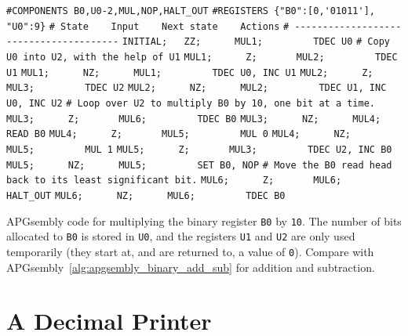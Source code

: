 \begin{apgsembly}
	\begin{algorithmic}\small
		\State \verb|#COMPONENTS B0,U0-2,MUL,NOP,HALT_OUT|
		\State \verb|#REGISTERS {"B0":[0,'01011'], "U0":9}|
		\State \verb|# State    Input    Next state    Actions|
		\State \verb|# ---------------------------------------|
		\State \verb|INITIAL;   ZZ;      MUL1;         TDEC U0|
		\State \verb||
		\State \verb|# Copy U0 into U2, with the help of U1|
		\State \verb|MUL1;      Z;       MUL2;         TDEC U1|
		\State \verb|MUL1;      NZ;      MUL1;         TDEC U0, INC U1|
		\State \verb|MUL2;      Z;       MUL3;         TDEC U2|
		\State \verb|MUL2;      NZ;      MUL2;         TDEC U1, INC U0, INC U2|
		\State \verb||
		\State \verb|# Loop over U2 to multiply B0 by 10, one bit at a time.|
		\State \verb|MUL3;      Z;       MUL6;         TDEC B0|
		\State \verb|MUL3;      NZ;      MUL4;         READ B0|
		\State \verb|MUL4;      Z;       MUL5;         MUL 0|
		\State \verb|MUL4;      NZ;      MUL5;         MUL 1|
		\State \verb|MUL5;      Z;       MUL3;         TDEC U2, INC B0|
		\State \verb|MUL5;      NZ;      MUL5;         SET B0, NOP|
		\State \verb||
		\State \verb|# Move the B0 read head back to its least significant bit.|
		\State \verb|MUL6;      Z;       MUL6;         HALT_OUT|
		\State \verb|MUL6;      NZ;      MUL6;         TDEC B0|
	\end{algorithmic}
	\caption{APGsembly code for multiplying the binary register \texttt{B0} by \texttt{10}. The number of bits allocated to \texttt{B0} is stored in \texttt{U0}, and the registers \texttt{U1} and \texttt{U2} are only used temporarily (they start at, and are returned to, a value of \texttt{0}). Compare with APGsembly~\ref{alg:apgsembly_binary_add_sub} for addition and subtraction.}\label{alg:apgsembly_mul_ten}
\end{apgsembly}



\section{A Decimal Printer}\label{sec:decimal_printer}

